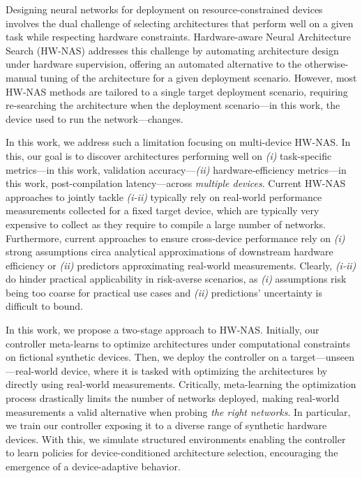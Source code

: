 Designing neural networks for deployment on resource-constrained devices involves the dual challenge of selecting architectures that perform well on a given task while respecting hardware constraints.
Hardware-aware Neural Architecture Search (HW-NAS) addresses this challenge by automating architecture design under hardware supervision, offering an automated alternative to the otherwise-manual tuning of the architecture for a given deployment scenario. However, most HW-NAS methods are tailored to a single target deployment scenario, requiring re-searching the architecture when the deployment scenario---in this work, the device used to run the network---changes.

In this work, we address such a limitation focusing on multi-device HW-NAS. In this, our goal is to discover architectures performing well on \emph{(i)} task-specific metrics---in this work, validation accuracy---\emph{(ii)} hardware-efficiency metrics---in this work, post-compilation latency---across \emph{multiple devices}.
Current HW-NAS approaches to jointly tackle \emph{(i-ii)} typically rely on real-world performance measurements collected for a fixed target device, which are typically very expensive to collect as they require to compile a large number of networks. 
Furthermore, current approaches to ensure cross-device performance rely on \emph{(i)} strong assumptions circa analytical approximations of downstream hardware efficiency or \emph{(ii)} predictors approximating real-world measurements. Clearly, \emph{(i-ii)} do hinder practical applicability in risk-averse scenarios, as \emph{(i)} assumptions risk being too coarse for practical use cases and \emph{(ii)} predictions' uncertainty is difficult to bound.

In this work, we propose a two-stage approach to HW-NAS. Initially, our controller meta-learns to optimize architectures under computational constraints on fictional synthetic devices. Then, we deploy the controller on a target---unseen---real-world device, where it is tasked with optimizing the architectures by directly using real-world measurements. Critically, meta-learning the optimization process drastically limits the number of networks deployed, making real-world measurements a valid alternative when probing \textit{the right networks}. In particular, we train our controller exposing it to a diverse range of synthetic hardware devices. With this, we simulate structured environments enabling the controller to learn policies for device-conditioned architecture selection, encouraging the emergence of a device-adaptive behavior.

